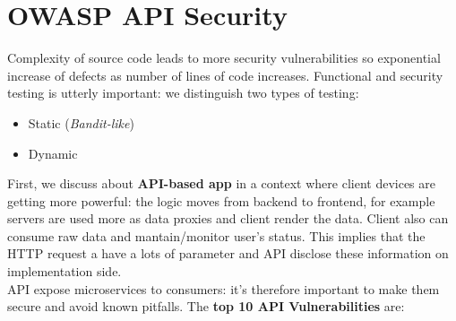 \documentclass[10pt,a4paper]{report}
\begin{document}
\section{OWASP API Security}
Complexity of source code leads to more security vulnerabilities so exponential increase of defects as number of lines of code increases. Functional and security testing is utterly important: we distinguish two types of testing:
\begin{itemize}
	\item Static (\textit{Bandit-like})
	\item Dynamic
\end{itemize}
First, we discuss about \textbf{API-based app} in a context where client devices are getting more powerful: the logic moves from backend to frontend, for example servers are used more as data proxies and client render the data. Client also can consume raw data and mantain/monitor user's status. This implies that the HTTP request a have a lots of parameter and API disclose these information on implementation side. \\
API expose microservices to consumers: it's therefore important to make them secure and avoid known pitfalls. The \textbf{top 10 API Vulnerabilities} are:
\end{document}
